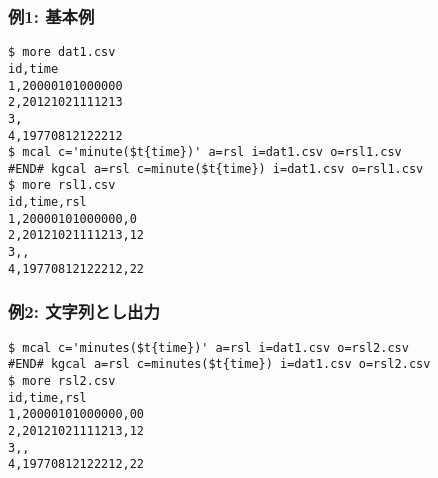 \subsubsection*{例1: 基本例}



\begin{Verbatim}[baselinestretch=0.7,frame=single]
$ more dat1.csv
id,time
1,20000101000000
2,20121021111213
3,
4,19770812122212
$ mcal c='minute($t{time})' a=rsl i=dat1.csv o=rsl1.csv
#END# kgcal a=rsl c=minute($t{time}) i=dat1.csv o=rsl1.csv
$ more rsl1.csv
id,time,rsl
1,20000101000000,0
2,20121021111213,12
3,,
4,19770812122212,22
\end{Verbatim}
\subsubsection*{例2: 文字列とし出力}



\begin{Verbatim}[baselinestretch=0.7,frame=single]
$ mcal c='minutes($t{time})' a=rsl i=dat1.csv o=rsl2.csv
#END# kgcal a=rsl c=minutes($t{time}) i=dat1.csv o=rsl2.csv
$ more rsl2.csv
id,time,rsl
1,20000101000000,00
2,20121021111213,12
3,,
4,19770812122212,22
\end{Verbatim}
